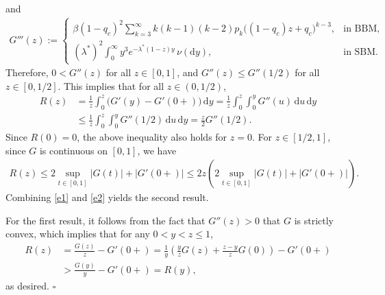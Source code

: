 \documentclass[10pt,a4paper]{amsart}
\numberwithin{equation}{section}
\def\qed{\hfill$\square$\smallskip}
\begin{document}
and 
\begin{align*}
	G'''(z) := 
	\begin{cases}
		\beta(1 - q_c)^2 \displaystyle \sum_{k=3}^\infty k(k-1)(k-2)p_k \bigl((1 - q_c)z + q_c\bigr)^{k-3}, & \text{in BBM},\\[8pt]
		(\lambda^*)^2 \displaystyle \int_0^\infty y^3 e^{-\lambda^*(1 - z)y} \, \nu(\mathrm{d}y), & \text{in SBM}.
	\end{cases}
\end{align*}
Therefore, $0 < G''(z)$ for all $z \in [0,1]$, and $G''(z) \leq G''(1/2)$ for all $z \in [0, 1/2]$. This implies that for all $z \in (0, 1/2)$,
\begin{align}\label{e1}
	R(z) 
	&= \frac{1}{z} \int_0^z \bigl(G'(y) - G'(0+)\bigr) \, \mathrm{d}y 
	= \frac{1}{z} \int_0^z \int_0^y G''(u) \, \mathrm{d}u \, \mathrm{d}y \nonumber\\
	&\leq \frac{1}{z} \int_0^z \int_0^y G''(1/2) \, \mathrm{d}u \, \mathrm{d}y 
	= \frac{z}{2} G''(1/2).
\end{align}
Since $R(0) = 0$, the above inequality also holds for $z = 0$. For $z \in [1/2, 1]$, since $G$ is continuous on $[0,1]$, we have
\begin{align}\label{e2}
	R(z) \leq 2 \sup_{t \in [0,1]} |G(t)| + |G'(0+)| 
	\leq 2z \left( 2 \sup_{t \in [0,1]} |G(t)| + |G'(0+)| \right).
\end{align}
Combining \eqref{e1} and \eqref{e2} yields the second result.

For the first result, it follows from the fact that $G''(z) > 0$ that $G$ is strictly convex, which implies that for any $0 < y < z \leq 1$,
\begin{align*}
	R(z) 
	&= \frac{G(z)}{z} - G'(0+) 
	= \frac{1}{y} \left( \frac{y}{z} G(z) + \frac{z-y}{z} G(0) \right) - G'(0+) \nonumber\\
	&> \frac{G(y)}{y} - G'(0+) = R(y),
\end{align*}
as desired.
\qed 
\end{document}
